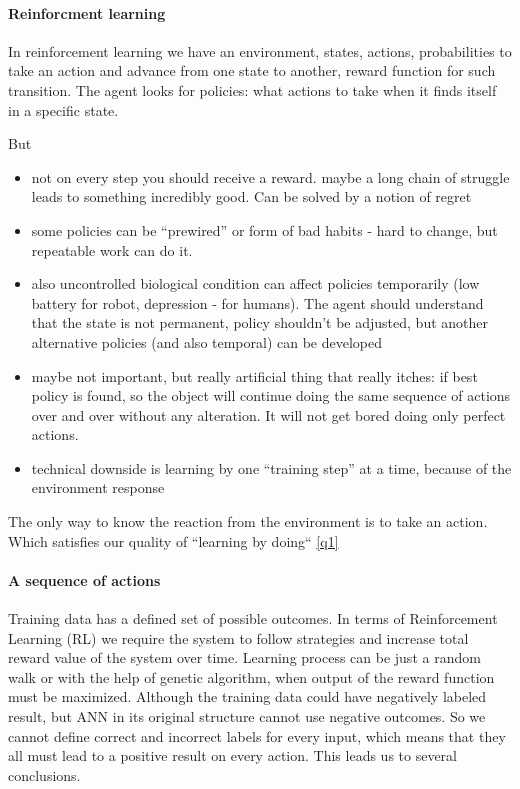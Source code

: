\documentclass[draft]{article}
\begin{document}
\paragraph{Reinforcment learning}
In reinforcement learning we have an environment, states, actions, probabilities to take an action and advance from one state to another, reward function for such transition. The agent looks for policies: what actions to take when it finds itself in a specific state.

But

\begin{itemize}
\item  not on every step you should receive a reward. maybe a long chain of struggle leads to something incredibly good. Can be solved by a notion of regret
\item some policies can be “prewired” or form of bad habits - hard to change, but repeatable work can do it.
\item also uncontrolled biological condition can affect policies temporarily (low battery for robot, depression - for humans). The agent should understand that the state is not permanent, policy shouldn’t be adjusted, but another alternative policies (and also temporal) can be developed
\item maybe not important, but really artificial thing that really itches: if best policy is found, so the object will continue doing the same sequence of actions over and over without any alteration. It will not get bored doing only perfect actions.
\item technical downside is learning by one “training step” at a time, because of the environment response
\end{itemize}

The only way to know the reaction from the environment is to take an action. Which satisfies our quality of “learning by doing“ \ref{q1}

\paragraph{A sequence of actions}
Training data has a defined set of possible outcomes. In terms of Reinforcement Learning (RL) we require the system to follow strategies and increase total reward value of the system over time.
Learning process can be just a random walk or with the help of genetic algorithm, when output of the reward function must be maximized.
Although the training data could have negatively labeled result, but ANN in its original structure cannot use negative outcomes. So we cannot define correct and incorrect labels for every input, which means that they all must lead to a positive result on every action. This leads us to several conclusions. 
\end{document}
